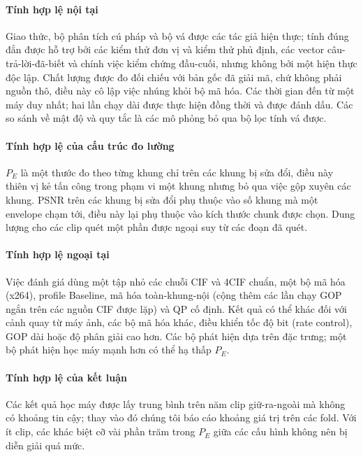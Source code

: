 \documentclass[journal]{IEEEtran}
\begin{document}
\paragraph{Tính hợp lệ nội tại} Giao thức, bộ phân tích cú pháp và bộ vá được
các tác giả hiện thực; tính đúng đắn được hỗ trợ bởi các kiểm thử đơn vị và kiểm
thử phủ định, các vector câu-trả-lời-đã-biết và chính việc kiểm chứng đầu-cuối,
nhưng không bởi một hiện thực độc lập. Chất lượng được đo đối chiếu với bản gốc
đã giải mã, chứ không phải nguồn thô, điều này cô lập việc nhúng khỏi bộ mã hóa.
Các thời gian đến từ một máy duy nhất; hai lần chạy dài được thực hiện đồng thời
và được đánh dấu. Các so sánh về mật độ và quy tắc là các mô phỏng bỏ qua bộ lọc
tính vá được.

\paragraph{Tính hợp lệ của cấu trúc đo lường} $P_E$ là một thước đo theo từng
khung chỉ trên các khung bị sửa đổi, điều này thiên vị kẻ tấn công trong phạm vi
một khung nhưng bỏ qua việc gộp xuyên các khung. PSNR trên các khung bị sửa đổi
phụ thuộc vào số khung mà một envelope chạm tới, điều này lại phụ thuộc vào kích
thước chunk được chọn. Dung lượng cho các clip quét một phần được ngoại suy từ
các đoạn đã quét.

\paragraph{Tính hợp lệ ngoại tại} Việc đánh giá dùng một tập nhỏ các chuỗi CIF
và 4CIF chuẩn, một bộ mã hóa (x264), profile Baseline, mã hóa toàn-khung-nội
(cộng thêm các lần chạy GOP ngắn trên các nguồn CIF được lặp) và QP cố định. Kết
quả có thể khác đối với cảnh quay từ máy ảnh, các bộ mã hóa khác, điều khiển tốc
độ bit (rate control), GOP dài hoặc độ phân giải cao hơn. Các bộ phát hiện dựa
trên đặc trưng; một bộ phát hiện học máy mạnh hơn có thể hạ thấp $P_E$.

\paragraph{Tính hợp lệ của kết luận} Các kết quả học máy được lấy trung bình
trên năm clip giữ-ra-ngoài mà không có khoảng tin cậy; thay vào đó chúng tôi báo
cáo khoảng giá trị trên các fold. Với ít clip, các khác biệt cỡ vài phần trăm
trong $P_E$ giữa các cấu hình không nên bị diễn giải quá mức.

\end{document}
